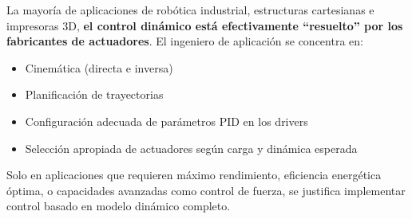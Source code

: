 La mayoría de aplicaciones de robótica industrial, estructuras cartesianas e impresoras 3D, \textbf{el control dinámico está efectivamente ``resuelto'' por los fabricantes de actuadores}. El ingeniero de aplicación se concentra en:

\begin{itemize}
    \item Cinemática (directa e inversa)
    \item Planificación de trayectorias
    \item Configuración adecuada de parámetros PID en los drivers
    \item Selección apropiada de actuadores según carga y dinámica esperada
\end{itemize}

Solo en aplicaciones que requieren máximo rendimiento, eficiencia energética óptima, o capacidades avanzadas como control de fuerza, se justifica implementar control basado en modelo dinámico completo.
